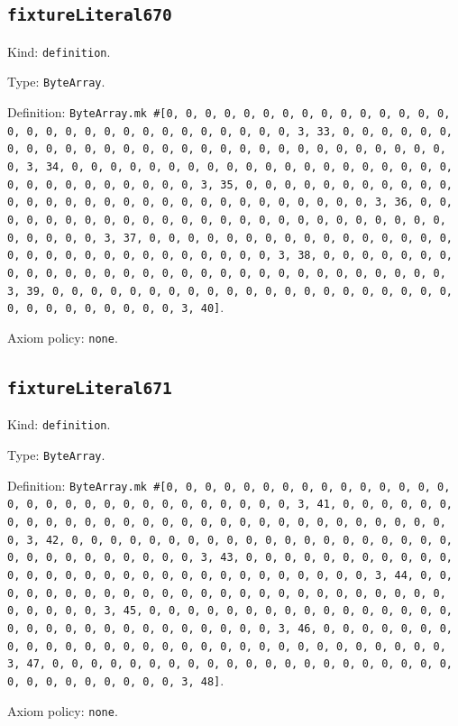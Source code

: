 \documentclass[11pt]{article}
\begin{document}
\subsection*{\texttt{fixtureLiteral670}}
\noindent Kind: \texttt{definition}.\par
\noindent Type: \texttt{ByteArray}.\par
\noindent Definition: \texttt{ByteArray.mk \#[0, 0, 0, 0, 0, 0, 0, 0, 0, 0, 0, 0, 0, 0, 0, 0, 0, 0, 0, 0, 0, 0, 0, 0, 0, 0, 0, 0, 0, 0, 3, 33, 0, 0, 0, 0, 0, 0, 0, 0, 0, 0, 0, 0, 0, 0, 0, 0, 0, 0, 0, 0, 0, 0, 0, 0, 0, 0, 0, 0, 0, 0, 3, 34, 0, 0, 0, 0, 0, 0, 0, 0, 0, 0, 0, 0, 0, 0, 0, 0, 0, 0, 0, 0, 0, 0, 0, 0, 0, 0, 0, 0, 0, 0, 3, 35, 0, 0, 0, 0, 0, 0, 0, 0, 0, 0, 0, 0, 0, 0, 0, 0, 0, 0, 0, 0, 0, 0, 0, 0, 0, 0, 0, 0, 0, 0, 3, 36, 0, 0, 0, 0, 0, 0, 0, 0, 0, 0, 0, 0, 0, 0, 0, 0, 0, 0, 0, 0, 0, 0, 0, 0, 0, 0, 0, 0, 0, 0, 3, 37, 0, 0, 0, 0, 0, 0, 0, 0, 0, 0, 0, 0, 0, 0, 0, 0, 0, 0, 0, 0, 0, 0, 0, 0, 0, 0, 0, 0, 0, 0, 3, 38, 0, 0, 0, 0, 0, 0, 0, 0, 0, 0, 0, 0, 0, 0, 0, 0, 0, 0, 0, 0, 0, 0, 0, 0, 0, 0, 0, 0, 0, 0, 3, 39, 0, 0, 0, 0, 0, 0, 0, 0, 0, 0, 0, 0, 0, 0, 0, 0, 0, 0, 0, 0, 0, 0, 0, 0, 0, 0, 0, 0, 0, 0, 3, 40]}.\par
\noindent Axiom policy: \texttt{none}.\par
\subsection*{\texttt{fixtureLiteral671}}
\noindent Kind: \texttt{definition}.\par
\noindent Type: \texttt{ByteArray}.\par
\noindent Definition: \texttt{ByteArray.mk \#[0, 0, 0, 0, 0, 0, 0, 0, 0, 0, 0, 0, 0, 0, 0, 0, 0, 0, 0, 0, 0, 0, 0, 0, 0, 0, 0, 0, 0, 0, 3, 41, 0, 0, 0, 0, 0, 0, 0, 0, 0, 0, 0, 0, 0, 0, 0, 0, 0, 0, 0, 0, 0, 0, 0, 0, 0, 0, 0, 0, 0, 0, 3, 42, 0, 0, 0, 0, 0, 0, 0, 0, 0, 0, 0, 0, 0, 0, 0, 0, 0, 0, 0, 0, 0, 0, 0, 0, 0, 0, 0, 0, 0, 0, 3, 43, 0, 0, 0, 0, 0, 0, 0, 0, 0, 0, 0, 0, 0, 0, 0, 0, 0, 0, 0, 0, 0, 0, 0, 0, 0, 0, 0, 0, 0, 0, 3, 44, 0, 0, 0, 0, 0, 0, 0, 0, 0, 0, 0, 0, 0, 0, 0, 0, 0, 0, 0, 0, 0, 0, 0, 0, 0, 0, 0, 0, 0, 0, 3, 45, 0, 0, 0, 0, 0, 0, 0, 0, 0, 0, 0, 0, 0, 0, 0, 0, 0, 0, 0, 0, 0, 0, 0, 0, 0, 0, 0, 0, 0, 0, 3, 46, 0, 0, 0, 0, 0, 0, 0, 0, 0, 0, 0, 0, 0, 0, 0, 0, 0, 0, 0, 0, 0, 0, 0, 0, 0, 0, 0, 0, 0, 0, 3, 47, 0, 0, 0, 0, 0, 0, 0, 0, 0, 0, 0, 0, 0, 0, 0, 0, 0, 0, 0, 0, 0, 0, 0, 0, 0, 0, 0, 0, 0, 0, 3, 48]}.\par
\noindent Axiom policy: \texttt{none}.\par
\end{document}
